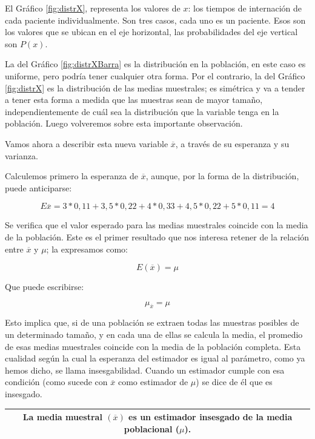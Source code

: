 \documentclass[]{book}
\begin{document}
El Gráfico \ref{fig:distrX}, representa los valores de \(x\): los tiempos de internación de cada paciente individualmente. Son tres casos, cada uno es un paciente. Esos son los valores que se ubican en el eje horizontal, las probabilidades del eje vertical son \(P(x)\).

La del Gráfico \ref{fig:distrXBarra} es la distribución en la población, en este caso es uniforme, pero podría tener cualquier otra forma. Por el contrario, la del Gráfico \ref{fig:distrX} es la distribución de las medias muestrales; es simétrica
y va a tender a tener esta forma a medida que las muestras sean de mayor
tamaño, independientemente de cuál sea la distribución que la variable
tenga en la población. Luego volveremos sobre esta importante
observación.

Vamos ahora a describir esta nueva variable \(\overline{x}\), a través de
su esperanza y su varianza.

Calculemos primero la esperanza de \(\overline{x}\), aunque, por la forma
de la distribución, puede anticiparse:

\[E\overline{x} = 3*0,11 + 3,5*0,22 + 4*0,33 + 4,5*0,22 + 5*0,11 = 4\]

Se verifica que el valor esperado para las medias muestrales coincide
con la media de la población. Este es el primer resultado que nos
interesa retener de la relación entre \(\overline{x}\) y \(\mu\); la expresamos como:

\[E(\overline{x}) = \mu\]

Que puede escribirse:

\[\mu_{\overline{x}} = \mu\]

Esto implica que, si de una población se extraen todas las muestras
posibles de un determinado tamaño, y en cada una de ellas se calcula la
media, el promedio de esas medias muestrales coincide con la media de la
población completa. Esta cualidad según la cual la esperanza del
estimador es igual al parámetro, como ya hemos dicho, se llama
insesgabilidad. Cuando un estimador cumple con esa condición (como
sucede con \(\overline{x}\) como estimador de \(\mu\)) se dice de él que es
insesgado.

\begin{longtable}[]{@{}c@{}}
\toprule
\endhead
\begin{minipage}[t]{0.97\columnwidth}\centering
La media muestral \((\overline{x})\) es un estimador \textbf{insesgado} de la media poblacional (\(\mu\)).\strut
\end{minipage}\tabularnewline
\bottomrule
\end{longtable}
\end{document}
